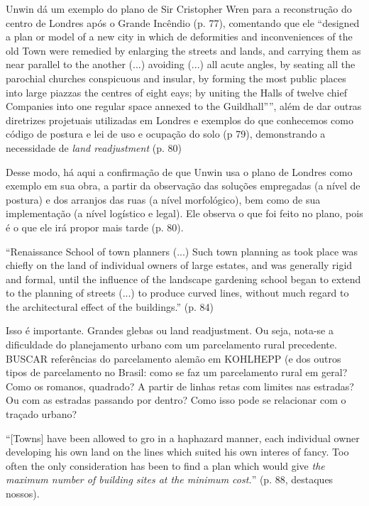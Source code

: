\documentclass[12pt, a4paper]{book} %
\begin{document}
        Unwin dá um exemplo do plano de Sir Cristopher Wren para a reconstrução do centro de Londres após o Grande Incêndio (p. 77), comentando que ele ``designed a plan or model of a new city in which de deformities and inconveniences of the old Town were remedied by enlarging the streets and lands, and carrying them as near parallel to the another (...) avoiding (...) all acute angles, by seating all the parochial churches conspicuous and insular, by forming the most public places into large piazzas the centres of eight eays; by uniting the Halls of twelve chief Companies into one regular space annexed to the Guildhall'''', além de dar outras diretrizes projetuais utilizadas em Londres e exemplos do que conhecemos como código de postura e lei de uso e ocupação do solo (p 79), demonstrando a necessidade de \textit{land readjustment} (p. 80)

        Desse modo, há aqui a confirmação de que Unwin usa o plano de Londres como exemplo em sua obra, a partir da observação das soluções empregadas (a nível de postura) e dos arranjos das ruas (a nível morfológico), bem como de sua implementação (a nível logístico e legal). Ele observa o que foi feito no plano, pois é o que ele irá propor mais tarde (p. 80).

        ``Renaissance School of town planners (...) Such town planning as took place was chiefly on the land of individual owners of large estates, and was generally rigid and formal, until the influence of the landscape gardening school began to extend to the planning of streets (...) to produce curved lines, without much regard to the architectural effect of the buildings.'' (p. 84)

        Isso é importante.  Grandes glebas ou land readjustment. Ou seja, nota-se a dificuldade do planejamento urbano com um parcelamento rural precedente.  BUSCAR referências do parcelamento alemão em KOHLHEPP (e dos outros tipos de parcelamento no Brasil: como se faz um parcelamento rural em geral? Como os romanos, quadrado? A partir de linhas retas com limites nas estradas? Ou com as estradas passando por dentro? Como isso pode se relacionar com o traçado urbano?

        ``[Towns] have been allowed to gro in a haphazard manner, each individual owner developing his own land on the lines which suited his own interes of fancy. Too often the only consideration has been to find a plan which would give \textit{the maximum number of building sites at the minimum cost.}'' (p. 88, destaques nossos).
\end{document}
